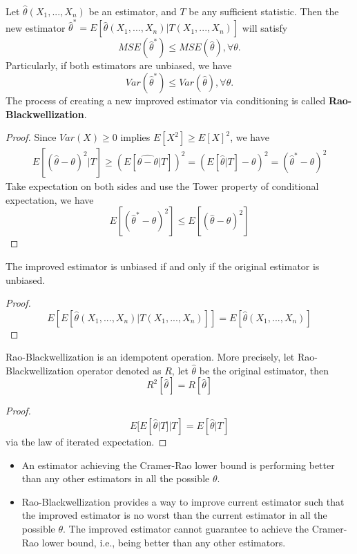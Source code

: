 \begin{refsection}
\begin{theorem}
	Let $\hat{\theta}(X_1,...,X_n)$ be an estimator, and $T$ be any sufficient statistic. Then the new estimator $\hat{\theta}^* = E[\hat{\theta}(X_1,...,X_n)|T(X_1,...,X_n)]$ will satisfy
	$$MSE(\hat{\theta}^*) \leq MSE(\hat{\theta}),\forall \theta.$$
	Particularly, if both estimators are unbiased, we have
	$$Var(\hat{\theta}^*) \leq Var(\hat{\theta}),\forall \theta .$$
	The process of creating a new improved estimator via conditioning is called \textbf{Rao-Blackwellization}.
\end{theorem}
\begin{proof}
	Since $Var(X) \geq 0$ implies $E[X^2]\geq E[X]^2$, we have
	\begin{align*}
	E[(\hat{\theta} - \theta)^2|T] \geq (E[\hat{\theta - \theta}|T])^2 = (E[\hat{\theta}|T] - \theta)^2 = (\hat{\theta}^* - \theta)^2
	\end{align*}	
	Take expectation on both sides and use the Tower property of conditional expectation, we have
	$$E[(\hat{\theta}^* - \theta)^2] \leq E[(\hat{\theta} - \theta)^2]$$
\end{proof}


\begin{lemma}
	The improved estimator is unbiased if and only if the original estimator is unbiased. 	
\end{lemma}
\begin{proof}
	$$E[E[\hat{\theta}(X_1,...,X_n)|T(X_1,...,X_n)]]=E[\hat{\theta}(X_1,...,X_n)]$$
\end{proof}


\begin{lemma}
	Rao-Blackwellization is an idempotent operation. More precisely, let Rao-Blackwellization operator denoted as $R$, let $\hat{\theta}$ be the original estimator, then
	$$R^2[\hat{\theta}] = R[\hat{\theta}]$$	
\end{lemma}
\begin{proof}
	$$E[E[\hat{\theta}|T]|T]=E[\hat{\theta}|T]$$
	via the law of iterated expectation.
\end{proof}


\begin{remark}\hfill
	\begin{itemize}
		\item An estimator achieving the Cramer-Rao lower bound is performing better than any other estimators in all the possible $\theta$.
		\item Rao-Blackwellization provides a way to improve current estimator such that the improved estimator is no worst than the current estimator in all the possible $\theta$. The improved estimator cannot guarantee to achieve the Cramer-Rao lower bound, i.e., being better than any other estimators. 
	\end{itemize}
\end{remark}





\end{refsection}
